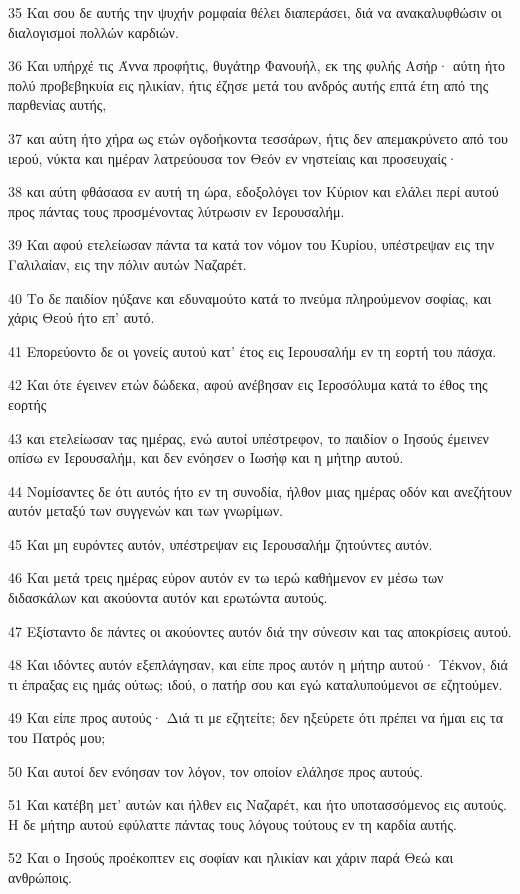 \par 35 Και σου δε αυτής την ψυχήν ρομφαία θέλει διαπεράσει, διά να ανακαλυφθώσιν οι διαλογισμοί πολλών καρδιών.
\par 36 Και υπήρχέ τις Άννα προφήτις, θυγάτηρ Φανουήλ, εκ της φυλής Ασήρ· αύτη ήτο πολύ προβεβηκυία εις ηλικίαν, ήτις έζησε μετά του ανδρός αυτής επτά έτη από της παρθενίας αυτής,
\par 37 και αύτη ήτο χήρα ως ετών ογδοήκοντα τεσσάρων, ήτις δεν απεμακρύνετο από του ιερού, νύκτα και ημέραν λατρεύουσα τον Θεόν εν νηστείαις και προσευχαίς·
\par 38 και αύτη φθάσασα εν αυτή τη ώρα, εδοξολόγει τον Κύριον και ελάλει περί αυτού προς πάντας τους προσμένοντας λύτρωσιν εν Ιερουσαλήμ.
\par 39 Και αφού ετελείωσαν πάντα τα κατά τον νόμον του Κυρίου, υπέστρεψαν εις την Γαλιλαίαν, εις την πόλιν αυτών Ναζαρέτ.
\par 40 Το δε παιδίον ηύξανε και εδυναμούτο κατά το πνεύμα πληρούμενον σοφίας, και χάρις Θεού ήτο επ' αυτό.
\par 41 Επορεύοντο δε οι γονείς αυτού κατ' έτος εις Ιερουσαλήμ εν τη εορτή του πάσχα.
\par 42 Και ότε έγεινεν ετών δώδεκα, αφού ανέβησαν εις Ιεροσόλυμα κατά το έθος της εορτής
\par 43 και ετελείωσαν τας ημέρας, ενώ αυτοί υπέστρεφον, το παιδίον ο Ιησούς έμεινεν οπίσω εν Ιερουσαλήμ, και δεν ενόησεν ο Ιωσήφ και η μήτηρ αυτού.
\par 44 Νομίσαντες δε ότι αυτός ήτο εν τη συνοδία, ήλθον μιας ημέρας οδόν και ανεζήτουν αυτόν μεταξύ των συγγενών και των γνωρίμων.
\par 45 Και μη ευρόντες αυτόν, υπέστρεψαν εις Ιερουσαλήμ ζητούντες αυτόν.
\par 46 Και μετά τρεις ημέρας εύρον αυτόν εν τω ιερώ καθήμενον εν μέσω των διδασκάλων και ακούοντα αυτόν και ερωτώντα αυτούς.
\par 47 Εξίσταντο δε πάντες οι ακούοντες αυτόν διά την σύνεσιν και τας αποκρίσεις αυτού.
\par 48 Και ιδόντες αυτόν εξεπλάγησαν, και είπε προς αυτόν η μήτηρ αυτού· Τέκνον, διά τι έπραξας εις ημάς ούτως; ιδού, ο πατήρ σου και εγώ καταλυπούμενοι σε εζητούμεν.
\par 49 Και είπε προς αυτούς· Διά τι με εζητείτε; δεν ηξεύρετε ότι πρέπει να ήμαι εις τα του Πατρός μου;
\par 50 Και αυτοί δεν ενόησαν τον λόγον, τον οποίον ελάλησε προς αυτούς.
\par 51 Και κατέβη μετ' αυτών και ήλθεν εις Ναζαρέτ, και ήτο υποτασσόμενος εις αυτούς. Η δε μήτηρ αυτού εφύλαττε πάντας τους λόγους τούτους εν τη καρδία αυτής.
\par 52 Και ο Ιησούς προέκοπτεν εις σοφίαν και ηλικίαν και χάριν παρά Θεώ και ανθρώποις.

